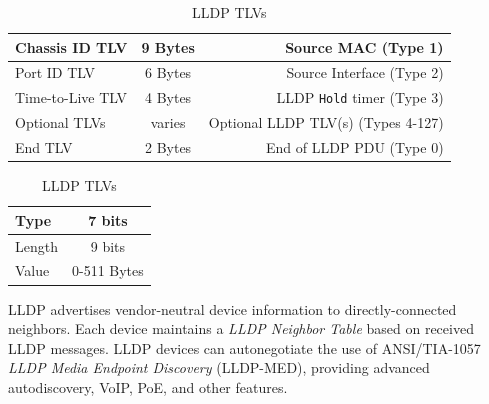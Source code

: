 \documentclass[12pt]{article}
\begin{document}
	\begin{table}[H]
	\begin{minipage}{.75\linewidth}
	\centering
	\caption{IEEE 802.1AB LLDP PDU Format \label{tab:802.1AB}}
	\begin{tabular}{| l | c | r |}\hline
	Chassis ID TLV	& 9 Bytes	& Source MAC (Type 1)\\\hline
	Port ID TLV		& 6 Bytes	& Source Interface (Type 2)\\\hline
	Time-to-Live TLV	& 4 Bytes	& LLDP \texttt{Hold} timer (Type 3)\\\hline
	Optional TLVs	& varies	& Optional LLDP TLV(s) (Types 4-127)\\\hline
	End TLV		& 2 Bytes	& End of LLDP PDU (Type 0)\\\hline
	\end{tabular}\end{minipage}\hfill
	\begin{minipage}{.24\linewidth}
	\centering
	\caption{LLDP TLVs \label{tab:LLDP TLV}}
	\begin{tabular}{| l | c |}\hline
	Type		& 7 bits\\\hline
	Length	& 9 bits\\\hline
	Value		& 0-511 Bytes\\\hline
	\end{tabular}\end{minipage}\end{table}
	LLDP advertises vendor-neutral device information to directly-connected neighbors. Each device maintains a \textit{LLDP Neighbor Table} based on received LLDP messages. LLDP devices can autonegotiate the use of ANSI/TIA-1057 \textit{LLDP Media Endpoint Discovery} (LLDP-MED), providing advanced autodiscovery, VoIP, PoE, and other features.


\end{document}
